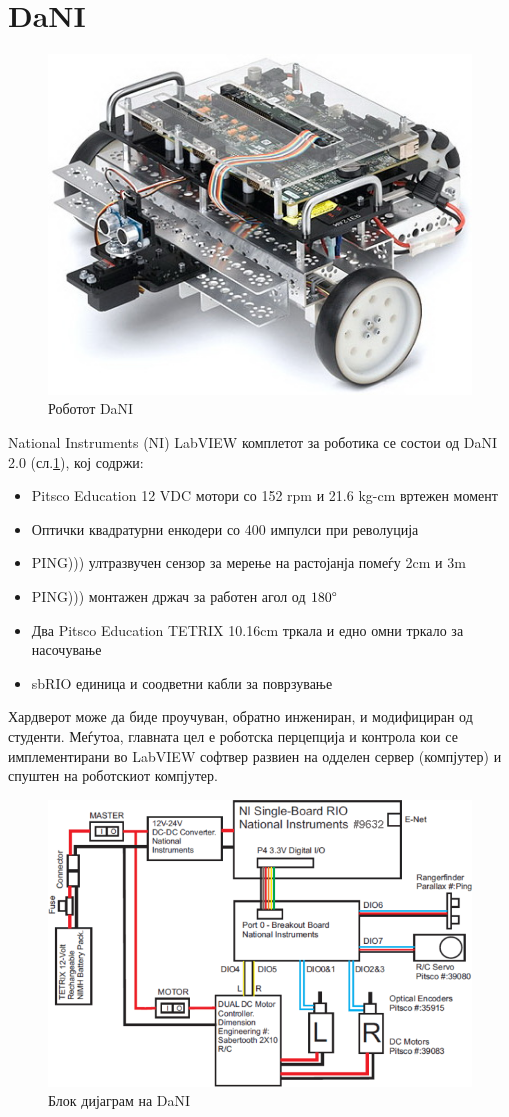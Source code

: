 \documentclass[12pt]{article}
\begin{document}
\section{DaNI}
  \begin{figure}[H]
    \includegraphics[width=0.6\linewidth, keepaspectratio]{./images/dani_isometric.jpg}
    \centering
    \caption{Роботот DaNI}
    \label{fig:dani_isometric.jpg}
    \end{figure}

	National Instruments (NI) LabVIEW комплетот за роботика се состои од DaNI 2.0 (сл.\ref{fig:dani_isometric.jpg}), кој содржи:

	\begin{itemize}
		\item Pitsco Education 12 VDC мотори со 152 rpm и 21.6 kg-cm вртежен момент
		\item Оптички квадратурни енкодери со 400 импулси при револуција
		\item PING))) ултразвучен сензор за мерење на растојанја помеѓу 2cm и 3m
		\item PING))) монтажен држач за работен агол од $180 \degree$
		\item Два Pitsco Education TETRIX 10.16cm тркала и едно омни тркало за насочување
		\item sbRIO единица и соодветни кабли за поврзување
		\end{itemize}

	Хардверот може да биде проучуван, обратно инжениран, и модифициран од студенти. Меѓутоа, главната цел е роботска перцепција и контрола кои се имплементирани во LabVIEW софтвер развиен на одделен сервер (компјутер) и спуштен на роботскиот компјутер.

	\begin{figure}[H]
		\includegraphics[width=0.75\linewidth]{./images/dani_block_diagram.png}
		\centering
		\caption{Блок дијаграм на DaNI}
		\label{fig:dani_block_diagram.png}
		\end{figure}
\end{document}
